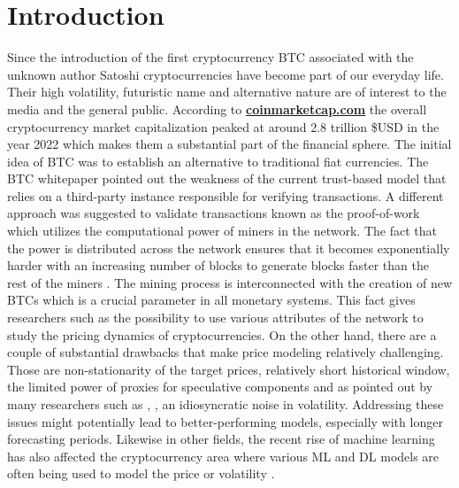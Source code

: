 \chapter{Introduction}
\label{chap:one}

Since the introduction of the first cryptocurrency \ac{BTC}
associated with the unknown author Satoshi \cite{Nakamoto2008} cryptocurrencies
have become part of our everyday life. Their high volatility, futuristic name 
and alternative nature are of interest to the media and the general public.
According to \textbf{\href{https://coinmarketcap.com/charts/}{coinmarketcap.com}}
the overall cryptocurrency market capitalization peaked at around 2.8 trillion \$USD in the year 2022
which makes them a substantial part of the financial sphere.
The initial idea of \ac{BTC} was to establish an alternative to traditional fiat currencies. 
The \ac{BTC} whitepaper
pointed out the weakness of the current trust-based model that relies on a third-party instance responsible
for verifying transactions.
A different approach was suggested to validate transactions known as the proof-of-work which
utilizes the computational power of miners in the network. The fact that the power is 
distributed across the network ensures that it becomes exponentially harder with an increasing number of blocks
to generate blocks faster than the rest of the miners \cite[pg.~6]{Nakamoto2008}. 
The mining process is interconnected with the creation of new \ac{BTC}s which is a crucial parameter
in all monetary systems. This fact gives researchers such as \cite{Kukacka2023} 
the possibility to use various attributes of the network to study the pricing dynamics of cryptocurrencies. 
On the other hand, there are a couple of substantial drawbacks that make price modeling relatively challenging.
Those are non-stationarity of the target prices, relatively short historical window, the limited power of
proxies for speculative components and as pointed out by many researchers 
such as \cite{Bouri2022}, \cite{Dimpfl2021}, \cite{Watorek2023} an idiosyncratic noise in volatility.
Addressing these issues might potentially lead to better-performing models, especially
with longer forecasting periods. Likewise in other fields, the recent rise of machine learning 
has also affected the cryptocurrency area where various \ac{ML} and \ac{DL} models 
are often being used 
to model the price \cite{Khedr2021} or volatility \cite{Kristjanpoller2018}. 


